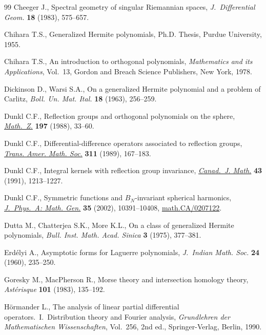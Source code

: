 \documentclass[11pt]{article}
\begin{document}
\begin{thebibliography}{99}
Cheeger J., Spectral geometry of singular {R}iemannian spaces,
  \textit{J.~Differential Geom.} \textbf{18} (1983), 575--657.

Chihara T.S., Generalized Hermite polynomials, Ph.D. Thesis, Purdue University,
  1955.

Chihara T.S., An introduction to orthogonal polynomials, \textit{Mathematics
  and its Applications}, Vol.~13, Gordon and Breach Science Publishers, New
  York, 1978.

Dickinson D., Warsi S.A., On a generalized {H}ermite polynomial and a problem
  of {C}arlitz, \textit{Boll. Un. Mat. Ital.} \textbf{18} (1963), 256--259.

Dunkl C.F., Ref\/lection groups and orthogonal polynomials on the sphere,
  \href{http://dx.doi.org/10.1007/BF01161629}{\textit{Math.~Z.}} \textbf{197} (1988), 33--60.

Dunkl C.F., Dif\/ferential-dif\/ference operators associated to ref\/lection groups,
  \href{http://dx.doi.org/10.2307/2001022}{\textit{Trans. Amer. Math. Soc.}} \textbf{311} (1989), 167--183.

Dunkl C.F., Integral kernels with ref\/lection group invariance,
  \href{http://dx.doi.org/10.4153/CJM-1991-069-8}{\textit{Canad.~J. Math.}} \textbf{43} (1991), 1213--1227.

Dunkl C.F., Symmetric functions and {$B_N$}-invariant spherical harmonics,
  \href{http://dx.doi.org/10.1088/0305-4470/35/48/312}{\textit{J.~Phys.~A: Math. Gen.}} \textbf{35} (2002), 10391--10408,
  \href{http://arxiv.org/abs/math.CA/0207122}{math.CA/0207122}.

Dutta M., Chatterjea S.K., More K.L., On a class of generalized {H}ermite
  polynomials, \textit{Bull. Inst. Math. Acad. Sinica} \textbf{3} (1975),
  377--381.

Erd{\'e}lyi A., Asymptotic forms for {L}aguerre polynomials, \textit{J.~Indian
  Math. Soc.} \textbf{24} (1960), 235--250.

Goresky M., MacPherson R., Morse theory and intersection homology theory,
  \textit{Ast\'erisque} \textbf{101} (1983), 135--192.

H{\"o}rmander L., The analysis of linear partial dif\/ferential operators.~{I}.~Distribution theory and Fourier ana\-lysis,
  \textit{Grundlehren der Mathematischen Wissenschaften}, Vol.~256, 2nd ed.,
  Springer-Verlag, Berlin, 1990.


\end{thebibliography}
\end{document}
